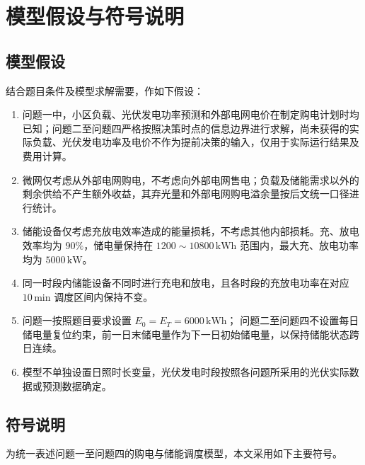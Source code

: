 \section{模型假设与符号说明}
\subsection{模型假设}

结合题目条件及模型求解需要，作如下假设：

\begin{enumerate}
    \item 问题一中，小区负载、光伏发电功率预测和外部电网电价在制定购电计划时均已知；问题二至问题四严格按照决策时点的信息边界进行求解，尚未获得的实际负载、光伏发电功率及电价不作为提前决策的输入，仅用于实际运行结果及费用计算。

    \item 微网仅考虑从外部电网购电，不考虑向外部电网售电；负载及储能需求以外的剩余供给不产生额外收益，其弃光量和外部电网购电溢余量按后文统一口径进行统计。

    \item 储能设备仅考虑充放电效率造成的能量损耗，不考虑其他内部损耗。充、放电效率均为 $90\%$，储电量保持在 $1200\sim10800\,\mathrm{kWh}$ 范围内，最大充、放电功率均为 $5000\,\mathrm{kW}$。

    \item 同一时段内储能设备不同时进行充电和放电，且各时段的充放电功率在对应 $10\,\mathrm{min}$ 调度区间内保持不变。

    \item 问题一按照题目要求设置
    $E_0=E_T=6000\,\mathrm{kWh}$；
    问题二至问题四不设置每日储电量复位约束，前一日末储电量作为下一日初始储电量，以保持储能状态跨日连续。

    \item 模型不单独设置日照时长变量，光伏发电时段按照各问题所采用的光伏实际数据或预测数据确定。
\end{enumerate}    




\subsection{符号说明}

为统一表述问题一至问题四的购电与储能调度模型，本文采用如下主要符号。

